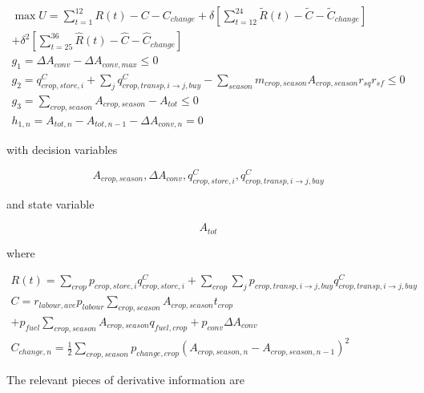 \documentclass[letter,12pt]{article}
\begin{document}
\begin{gather}
\max U = \sum_{t=1}^{12} R\left(t\right) - C - C_{change} + \delta \left[\sum_{t=12}^{24} \tilde{R}\left(t\right) - \tilde{C} - \tilde{C}_{change}\right] \nonumber \\
+ \delta^2 \left[\sum_{t=25}^{36} \hat{R}\left(t\right) - \hat{C} - \hat{C}_{change}\right] \\
g_1 = \Delta A_{conv} - \Delta A_{conv,max} \leq 0\\
g_2 = q_{crop,store,i}^C + \sum_j q_{crop,transp,i \rightarrow j,buy}^C - \sum_{season} m_{crop,season}  A_{crop,season} r_{sq} r_{sf} \leq 0\\
g_3 = \sum_{crop,season} A_{crop,season} - A_{tot} \leq 0 \\
h_{1,n} = A_{tot,n} - A_{tot,n-1} - \Delta A_{conv,n} = 0
\end{gather}

\noindent with decision variables

\begin{equation}
A_{crop,season},\Delta A_{conv},q_{crop,store,i}^C,q_{crop,transp,i\rightarrow j,buy}^C
\end{equation}

\noindent and state variable

\begin{equation}
A_{tot}
\end{equation}

\noindent where

\begin{gather}
R\left(t\right) = \sum_{crop} p_{crop,store,i} q_{crop,store,i}^C + \sum_{crop} \sum_j p_{crop,transp,i\rightarrow j,buy} q_{crop,transp,i\rightarrow j,buy}^C \\
C = r_{labour,ave} p_{labour} \sum_{crop,season} A_{crop,season} t_{crop} \nonumber \\
+ p_{fuel} \sum_{crop,season} A_{crop,season} q_{fuel,crop} + p_{conv} \Delta A_{conv} \\
C_{change,n} = \frac{1}{2} \sum_{crop,season} p_{change,crop} \left( A_{crop,season,n} - A_{crop,season,n-1} \right)^2
\end{gather}

The relevant pieces of derivative information are
\end{document}
